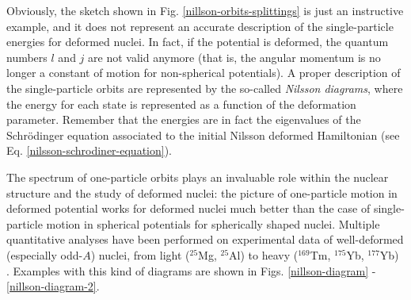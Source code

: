 Obviously, the sketch shown in Fig. \ref{nillson-orbits-splittings} is just an instructive example, and it does not represent an accurate description of the single-particle energies for deformed nuclei. In fact, if the potential is deformed, the quantum numbers $l$ and $j$ are not valid anymore (that is, the angular momentum is no longer a constant of motion for non-spherical potentials). A proper description of the single-particle orbits are represented by the so-called \emph{Nilsson diagrams}, where the energy for each state is represented as a function of the deformation parameter. Remember that the energies are in fact the eigenvalues of the Schrödinger equation associated to the initial Nilsson deformed Hamiltonian (see Eq. \ref{nilsson-schrodiner-equation}).

The spectrum of one-particle orbits plays an invaluable role within the nuclear structure and the study of deformed nuclei: the picture of one-particle motion in deformed potential works for deformed nuclei much better than the case of single-particle motion in spherical potentials for spherically shaped nuclei. Multiple quantitative analyses have been performed on experimental data of well-deformed (especially odd-$A$) nuclei, from light ($^{25}$Mg, $^{25}$Al) to heavy ($^{169}$Tm, $^{175}$Yb, $^{177}$Yb) \cite{hamamoto2016interplay}. Examples with this kind of diagrams are shown in Figs. \ref{nillson-diagram} - \ref{nillson-diagram-2}. 

